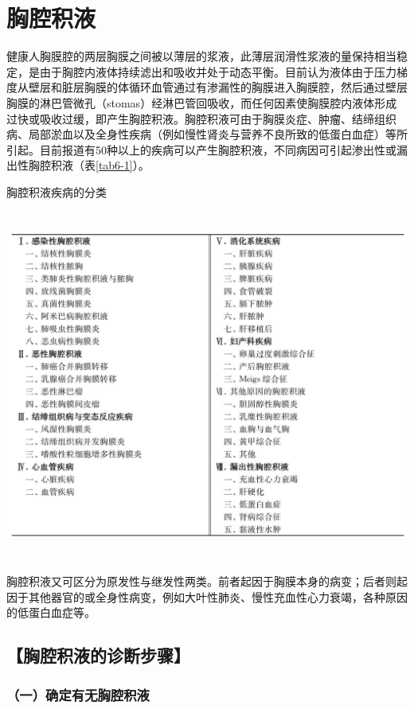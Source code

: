 \chapter{胸腔积液}

健康人胸膜腔的两层胸膜之间被以薄层的浆液，此薄层润滑性浆液的量保持相当稳定，是由于胸腔内液体持续滤出和吸收并处于动态平衡。目前认为液体由于压力梯度从壁层和脏层胸膜的体循环血管通过有渗漏性的胸膜进入胸膜腔，然后通过壁层胸膜的淋巴管微孔（stomas）经淋巴管回吸收，而任何因素使胸膜腔内液体形成过快或吸收过缓，即产生胸腔积液。胸腔积液可由于胸膜炎症、肿瘤、结缔组织病、局部淤血以及全身性疾病（例如慢性肾炎与营养不良所致的低蛋白血症）等所引起。目前报道有50种以上的疾病可以产生胸腔积液，不同病因可引起渗出性或漏出性胸腔积液（表\ref{tab6-1}）。

\begin{table}[htbp]
\centering
\caption{胸腔积液疾病的分类}
\label{tab6-1}
\includegraphics[width=5.95833in,height=4.55208in]{./images/Image00049.jpg}
\end{table}

胸腔积液又可区分为原发性与继发性两类。前者起因于胸膜本身的病变；后者则起因于其他器官的或全身性病变，例如大叶性肺炎、慢性充血性心力衰竭，各种原因的低蛋白血症等。

\section{【胸腔积液的诊断步骤】}

\subsection{（一）确定有无胸腔积液}

